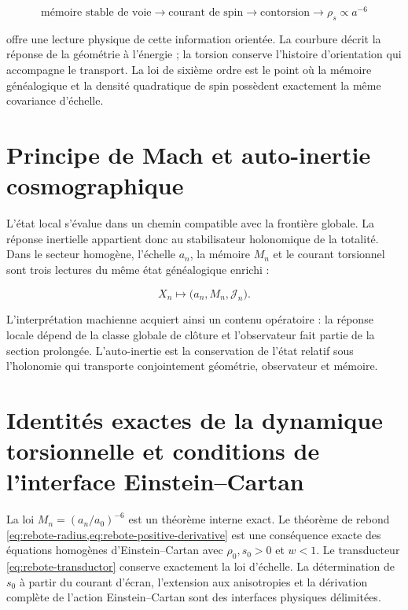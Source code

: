\begin{equation}
 \text{mémoire stable de voie}
 \longrightarrow
 \text{courant de spin}
 \longrightarrow
 \text{contorsion}
 \longrightarrow
 \rho_s\propto a^{-6}
 \label{eq:rebote-genealogy}
\end{equation}

offre une lecture physique de cette information orientée. La courbure
décrit la réponse de la géométrie à l'énergie ; la torsion conserve
l'histoire d'orientation qui accompagne le transport. La loi de sixième
ordre est le point où la mémoire généalogique et la densité quadratique de
spin possèdent exactement la même covariance d'échelle.

\section{Principe de Mach et auto-inertie cosmographique}

L'état local s'évalue dans un chemin compatible avec la frontière
globale. La réponse inertielle appartient donc au stabilisateur
holonomique de la totalité. Dans le secteur homogène, l'échelle \(a_n\), la
mémoire \(M_n\) et le courant torsionnel sont trois lectures du même état
généalogique enrichi :

\begin{equation}
 X_n\longmapsto
 \bigl(a_n,M_n,\mathcal J_n\bigr).
 \label{eq:rebote-mach-triple}
\end{equation}

L'interprétation machienne acquiert ainsi un contenu opératoire : la
réponse locale dépend de la classe globale de clôture et l'observateur fait
partie de la section prolongée. L'auto-inertie est la conservation de
l'état relatif sous l'holonomie qui transporte conjointement géométrie,
observateur et mémoire.

\section{Identités exactes de la dynamique torsionnelle et conditions de l'interface Einstein–Cartan}

\begin{proofstatusbox}
La loi \(M_n=(a_n/a_0)^{-6}\) est un théorème interne exact. Le théorème de
rebond \cref{eq:rebote-radius,eq:rebote-positive-derivative} est une
conséquence exacte des équations homogènes d'Einstein--Cartan
\cite{Hehl1976} avec
\(\rho_0,s_0>0\) et \(w<1\). Le transducteur
\cref{eq:rebote-transductor} conserve exactement la loi d'échelle. La
détermination de \(s_0\) à partir du courant d'écran, l'extension aux
anisotropies et la dérivation complète de l'action Einstein--Cartan sont
des interfaces physiques délimitées.
\end{proofstatusbox}

